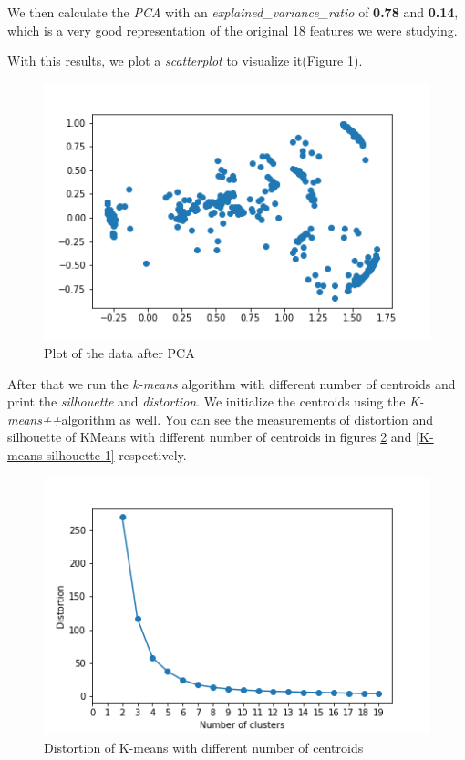 \documentclass[idxtotoc,hyperref,openany]{labbook} %
\begin{document}

We then calculate the \textit{PCA} with an \textit{explained\_variance\_ratio} of \textbf{0.78} and \textbf{0.14}, which is a very good representation of the original 18 features we were studying.

With this results, we plot a \textit{scatterplot} to visualize it(Figure \ref{data plot 1}).

\begin{figure}[h]
\includegraphics[width=0.9\linewidth]{PCA_Plot_Accelerometer_Day1.png}
\setlength\belowcaptionskip{-10pt}
\caption{Plot of the data after PCA}
\label{data plot 1}
\end{figure}



After that we run the \textit{k-means} algorithm with different number of centroids and print the \textit{silhouette} and \textit{distortion}. We initialize the centroids using the \textit{K-means++}algorithm as well. You can see the measurements of distortion and silhouette of KMeans with different number of centroids in figures \ref{K-means distortion 1} and \ref{K-means silhouette 1} respectively.\\


\begin{figure}[h]
\includegraphics[width=0.9\linewidth]{KMeans_Distortion_Accelerometer_Day1.png}
\setlength\belowcaptionskip{-10pt}
\caption{Distortion of K-means with different number of centroids}
\label{K-means distortion 1}
\end{figure}
\end{document}
